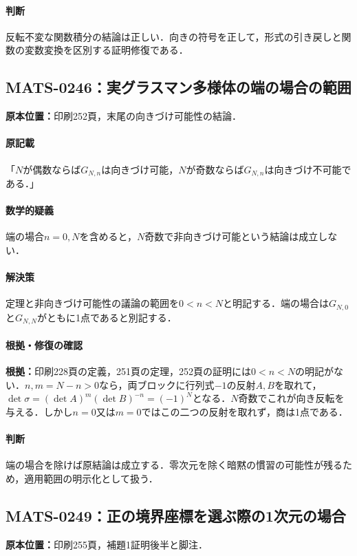 \documentclass[a4paper,10pt]{ltjsarticle}
\begin{document}
\paragraph{判断}反転不変な関数積分の結論は正しい．向きの符号を正して，形式の引き戻しと関数の変数変換を区別する証明修復である．


\subsection*{MATS-0246：実グラスマン多様体の端の場合の範囲}\label{math:MATS-0246}
\noindent\textbf{原本位置：}印刷252頁，末尾の向きづけ可能性の結論．

\paragraph{原記載}「$N$が偶数ならば$G_{N,n}$は向きづけ可能，$N$が奇数ならば$G_{N,n}$は向きづけ不可能である．」

\paragraph{数学的疑義}端の場合$n=0,N$を含めると，$N$奇数で非向きづけ可能という結論は成立しない．

\paragraph{解決策}定理と非向きづけ可能性の議論の範囲を$0<n<N$と明記する．端の場合は$G_{N,0}$と$G_{N,N}$がともに1点であると別記する．

\paragraph{根拠・修復の確認}\textbf{根拠：}印刷228頁の定義，251頁の定理，252頁の証明には$0<n<N$の明記がない．$n,m=N-n>0$なら，両ブロックに行列式$-1$の反射$A,B$を取れて，$\det\sigma=(\det A)^m(\det B)^{-n}=(-1)^N$となる．$N$奇数でこれが向き反転を与える．しかし$n=0$又は$m=0$ではこの二つの反射を取れず，商は1点である．

\paragraph{判断}端の場合を除けば原結論は成立する．零次元を除く暗黙の慣習の可能性が残るため，適用範囲の明示化として扱う．


\subsection*{MATS-0249：正の境界座標を選ぶ際の1次元の場合}\label{math:MATS-0249}
\noindent\textbf{原本位置：}印刷255頁，補題1証明後半と脚注．
\end{document}
